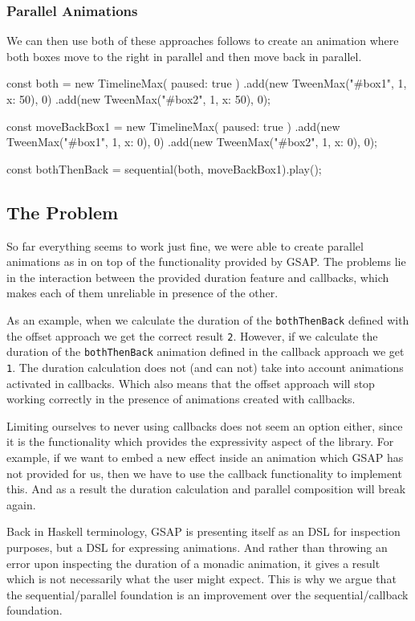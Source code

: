 \subsubsection{Parallel Animations}

We can then use both of these approaches follows to create an animation where both boxes move to the right in parallel and then move back in parallel.

\begin{js}
const both = new TimelineMax({ paused: true })
  .add(new TweenMax("#box1", 1, {x: 50}), 0)
  .add(new TweenMax("#box2", 1, {x: 50}), 0);

const moveBackBox1 = new TimelineMax({ paused: true })
  .add(new TweenMax("#box1", 1, {x: 0}), 0)
  .add(new TweenMax("#box2", 1, {x: 0}), 0);

const bothThenBack = sequential(both, moveBackBox1).play();
\end{js}

\subsection{The Problem}

So far everything seems to work just fine, we were able to create parallel animations as in \dsl{} on top of the functionality provided by GSAP. The problems lie in the interaction between the provided duration feature and callbacks, which makes each of them unreliable in presence of the other.

As an example, when we calculate the duration of the \texttt{bothThenBack} defined with the offset approach we get the correct result \texttt{2}. However, if we calculate the duration of the \texttt{bothThenBack} animation defined in the callback approach we get \texttt{1}. The duration calculation does not (and can not) take into account animations activated in callbacks. Which also means that the offset approach will stop working correctly in the presence of animations created with callbacks.

Limiting ourselves to never using callbacks does not seem an option either, since it is the functionality which provides the expressivity aspect of the library. For example, if we want to embed a new effect inside an animation which GSAP has not provided for us, then we have to use the callback functionality to implement this. And as a result the duration calculation and parallel composition will break again.

Back in Haskell terminology, GSAP is presenting itself as an  DSL for inspection purposes, but a  DSL for expressing animations. And rather than throwing an error upon inspecting the duration of a monadic animation, it gives a result which is not necessarily what the user might expect. This is why we argue that the sequential/parallel foundation is an improvement over the sequential/callback foundation.
